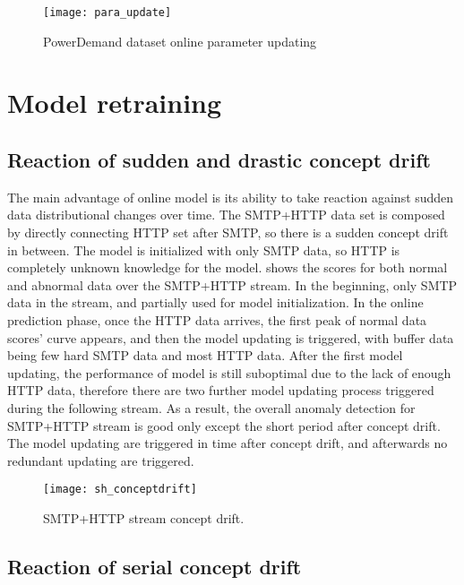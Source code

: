 \begin{figure}[h]
\centering
\texttt{[image: para\_update]}
\caption[PowerDemand dataset online parameter updating]{PowerDemand dataset online parameter updating}
\label{fig:parachanges}
\end{figure}



\section{Model retraining}
\label{sec:retraining}

\subsection{Reaction of sudden and drastic concept drift}
\label{sec:reaction}

The main advantage of online model is its ability to take reaction against sudden data distributional changes over time. The SMTP+HTTP data set is composed by directly connecting HTTP set after SMTP, so there is a sudden concept drift in between. The model is initialized with only SMTP data, so HTTP is completely unknown knowledge for the model.  shows the scores for both normal and abnormal data over the SMTP+HTTP stream. In the beginning, only SMTP data in the stream, and partially used for model initialization. In the online prediction phase, once the HTTP data arrives, the first peak of normal data scores’ curve appears, and then the model updating is triggered, with buffer data being few hard SMTP data and most HTTP data. After the first model updating, the performance of model is still suboptimal due to the lack of enough HTTP data, therefore there are two further model updating process triggered during the following stream. As a result, the overall anomaly detection for SMTP+HTTP stream is good only except the short period after concept drift. The model updating are triggered in time after concept drift, and afterwards no redundant updating are triggered.\\

\begin{figure}[h]
\centering
\texttt{[image: sh\_conceptdrift]}
\caption[SMTP+HTTP stream concept drift]{SMTP+HTTP stream concept drift.}
\label{fig:smtp+http}
\end{figure}

\subsection{Reaction of serial concept drift}
\label{sec:reaction}

